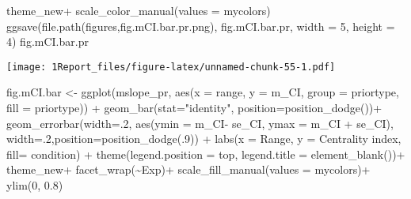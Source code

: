 \documentclass[
]{article}
\newenvironment{Shaded}{\begin{snugshade}}{\end{snugshade}}
\newcommand{\AttributeTok}[1]{\textcolor[rgb]{0.77,0.63,0.00}{#1}}
\newcommand{\DecValTok}[1]{\textcolor[rgb]{0.00,0.00,0.81}{#1}}
\newcommand{\FloatTok}[1]{\textcolor[rgb]{0.00,0.00,0.81}{#1}}
\newcommand{\FunctionTok}[1]{\textcolor[rgb]{0.00,0.00,0.00}{#1}}
\newcommand{\NormalTok}[1]{#1}
\newcommand{\OtherTok}[1]{\textcolor[rgb]{0.56,0.35,0.01}{#1}}
\newcommand{\SpecialCharTok}[1]{\textcolor[rgb]{0.00,0.00,0.00}{#1}}
\newcommand{\StringTok}[1]{\textcolor[rgb]{0.31,0.60,0.02}{#1}}
\begin{document}
\begin{Shaded}
\begin{Highlighting}[]
\NormalTok{  theme\_new}\SpecialCharTok{+}
  \FunctionTok{scale\_color\_manual}\NormalTok{(}\AttributeTok{values =}\NormalTok{ mycolors)}
\FunctionTok{ggsave}\NormalTok{(}\FunctionTok{file.path}\NormalTok{(}\StringTok{\textquotesingle{}figures\textquotesingle{}}\NormalTok{,}\StringTok{\textquotesingle{}fig.mCI.bar.pr.png\textquotesingle{}}\NormalTok{), fig.mCI.bar.pr, }\AttributeTok{width =} \DecValTok{5}\NormalTok{, }\AttributeTok{height =} \DecValTok{4}\NormalTok{)}
\NormalTok{fig.mCI.bar.pr}
\end{Highlighting}
\end{Shaded}

\texttt{[image: 1Report\_files/figure-latex/unnamed-chunk-55-1.pdf]}

\begin{Shaded}
\begin{Highlighting}[]
\NormalTok{fig.mCI.bar }\OtherTok{\textless{}{-}} \FunctionTok{ggplot}\NormalTok{(mslope\_pr, }\FunctionTok{aes}\NormalTok{(}\AttributeTok{x =}\NormalTok{ range, }\AttributeTok{y =}\NormalTok{ m\_CI, }\AttributeTok{group =}\NormalTok{ priortype, }\AttributeTok{fill =}\NormalTok{ priortype)) }\SpecialCharTok{+} 
  \FunctionTok{geom\_bar}\NormalTok{(}\AttributeTok{stat=}\StringTok{"identity"}\NormalTok{, }\AttributeTok{position=}\FunctionTok{position\_dodge}\NormalTok{())}\SpecialCharTok{+}
  \FunctionTok{geom\_errorbar}\NormalTok{(}\AttributeTok{width=}\NormalTok{.}\DecValTok{2}\NormalTok{, }\FunctionTok{aes}\NormalTok{(}\AttributeTok{ymin =}\NormalTok{ m\_CI}\SpecialCharTok{{-}}\NormalTok{ se\_CI, }\AttributeTok{ymax =}\NormalTok{ m\_CI }\SpecialCharTok{+}\NormalTok{ se\_CI), }\AttributeTok{width=}\NormalTok{.}\DecValTok{2}\NormalTok{,}\AttributeTok{position=}\FunctionTok{position\_dodge}\NormalTok{(.}\DecValTok{9}\NormalTok{)) }\SpecialCharTok{+}
  \FunctionTok{labs}\NormalTok{(}\AttributeTok{x =} \StringTok{\textquotesingle{}Range\textquotesingle{}}\NormalTok{, }\AttributeTok{y =} \StringTok{\textquotesingle{}Centrality index\textquotesingle{}}\NormalTok{, }\AttributeTok{fill=} \StringTok{\textquotesingle{}condition\textquotesingle{}}\NormalTok{) }\SpecialCharTok{+}
  \FunctionTok{theme}\NormalTok{(}\AttributeTok{legend.position =} \StringTok{\textquotesingle{}top\textquotesingle{}}\NormalTok{, }\AttributeTok{legend.title =} \FunctionTok{element\_blank}\NormalTok{())}\SpecialCharTok{+}
\NormalTok{  theme\_new}\SpecialCharTok{+}
  \FunctionTok{facet\_wrap}\NormalTok{(}\SpecialCharTok{\textasciitilde{}}\NormalTok{Exp)}\SpecialCharTok{+}
  \FunctionTok{scale\_fill\_manual}\NormalTok{(}\AttributeTok{values =}\NormalTok{ mycolors)}\SpecialCharTok{+}
  \FunctionTok{ylim}\NormalTok{(}\DecValTok{0}\NormalTok{, }\FloatTok{0.8}\NormalTok{)}
\end{Highlighting}
\end{Shaded}
\end{document}
